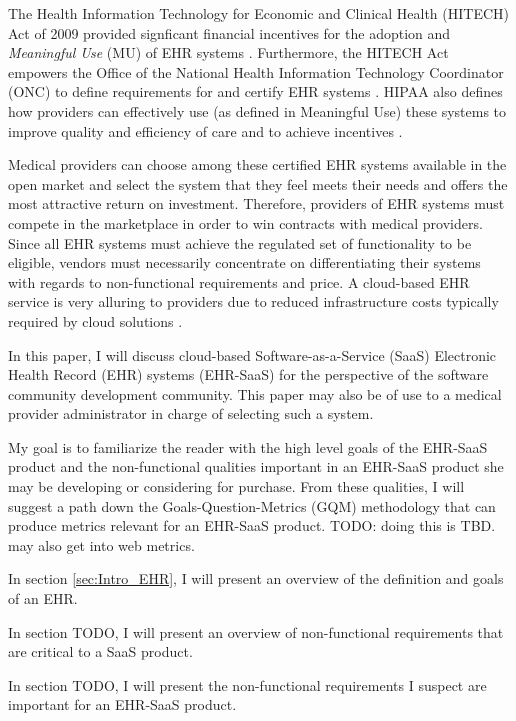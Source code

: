 \documentclass[10pt]{article}
\begin{document}
The Health Information Technology for Economic and Clinical Health (HITECH) Act of 2009 provided signficant financial incentives for the adoption and \textit{Meaningful Use} (MU) of EHR systems \cite{ehrbook}.
Furthermore, the HITECH Act empowers the Office of the National Health Information Technology Coordinator (ONC) to define requirements for and certify EHR systems \cite{onc-ehr}.
HIPAA also defines how providers can effectively use (as defined in Meaningful Use) these systems to improve quality and efficiency of care and to achieve incentives \cite{ehrbook}.

Medical providers can choose among these certified EHR systems available in the open market and select the system that they feel meets their needs and offers the most attractive return on investment.
Therefore, providers of EHR systems must compete in the marketplace in order to win contracts with medical providers.
Since all EHR systems must achieve the regulated set of functionality to be eligible, vendors must necessarily concentrate on differentiating their systems with regards to non-functional requirements and price.
A cloud-based EHR service is very alluring to providers due to reduced infrastructure costs typically required by cloud solutions \cite{auditingprivacy}.

In this paper, I will discuss cloud-based Software-as-a-Service (SaaS) Electronic Health Record (EHR) systems (EHR-SaaS) for the perspective
of the software community development community. 
This paper may also be of use to a medical provider administrator in charge of selecting such a system.

My goal is to familiarize the reader with the high level goals of the EHR-SaaS product and the non-functional qualities important in an EHR-SaaS product she may be developing or considering for purchase.
From these qualities, I will suggest a path down the Goals-Question-Metrics (GQM) methodology that can produce metrics relevant for an EHR-SaaS product.
TODO: doing this is TBD. may also get into web metrics.

In section \ref{sec:Intro_EHR}, I will present an overview of the definition and goals of an EHR.

In section TODO, I will present an overview of non-functional requirements that are critical to a SaaS product.

In section TODO, I will present the non-functional requirements I suspect are important for an EHR-SaaS product.
\end{document}
